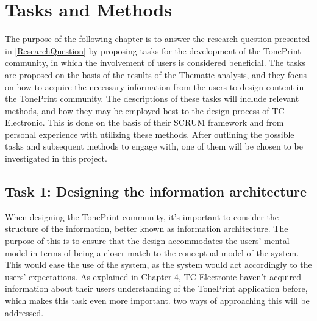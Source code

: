 \chapter{Tasks and Methods}
\label{TaskAndMethods}
The purpose of the following chapter is to answer the research question presented in \autoref{ResearchQuestion} by proposing tasks for the development of the TonePrint community, in which the involvement of users is considered beneficial. The tasks are proposed on the basis of the results of the Thematic analysis, and they focus on how to acquire the necessary information from the users to design content in the TonePrint community. The descriptions of these tasks will include relevant methods, and how they may be employed best to the design process of TC Electronic. This is done on the basis of their SCRUM framework and from personal experience with utilizing these methods. After outlining the possible tasks and subsequent methods to engage with, one of them will be chosen to be investigated in this project.


\section{Task 1: Designing the information architecture}
\label{Task1}
When designing the TonePrint community, it's important to consider the structure of the information, better known as information architecture. The purpose of this is to ensure that the design accommodates the users' mental model in terms of being a closer match to the conceptual model of the system. This would ease the use of the system, as the system would act accordingly to the users' expectations. As explained in Chapter 4, TC Electronic haven't acquired information about their users understanding of the TonePrint application before, which makes this task even more important. two ways of approaching this will be addressed. \\

